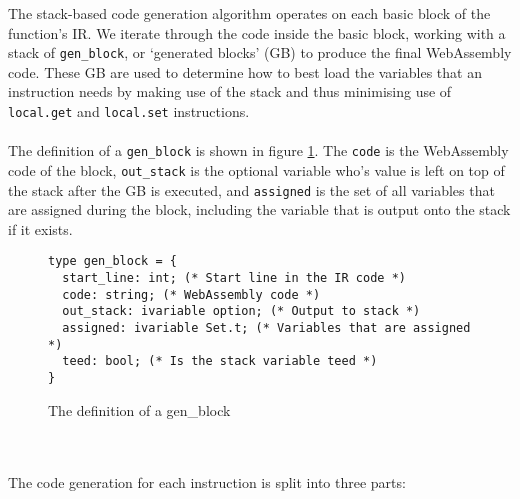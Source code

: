 \documentclass[12pt,twoside,notitlepage]{report}
\newcommand{\camlinline}{\texttt}
\newcommand{\wainline}{\texttt}
\begin{document}
The stack-based code generation algorithm operates on each basic block of the function's IR. We iterate through the code inside the basic block, working with a stack of \camlinline{gen_block}, or `generated blocks' (GB) to produce the final WebAssembly code. These GB are used to determine how to best load the variables that an instruction needs by making use of the stack and thus minimising use of \wainline{local.get} and \wainline{local.set} instructions.
\\\\
The definition of a \camlinline{gen_block} is shown in figure \ref{fig:genblock}. The \camlinline{code} is the WebAssembly code of the block, \camlinline{out_stack} is the optional variable who's value is left on top of the stack after the GB is executed, and \camlinline{assigned} is the set of all variables that are assigned during the block, including the variable that is output onto the stack if it exists.
\begin{figure}[h]
	\begin{verbatim}
type gen_block = {
  start_line: int; (* Start line in the IR code *)
  code: string; (* WebAssembly code *)
  out_stack: ivariable option; (* Output to stack *)
  assigned: ivariable Set.t; (* Variables that are assigned *)
  teed: bool; (* Is the stack variable teed *)
}
	\end{verbatim}
	\caption{The definition of a gen\_block}
	\label{fig:genblock}
\end{figure}
\\\\
The code generation for each instruction is split into three parts:
\end{document}
